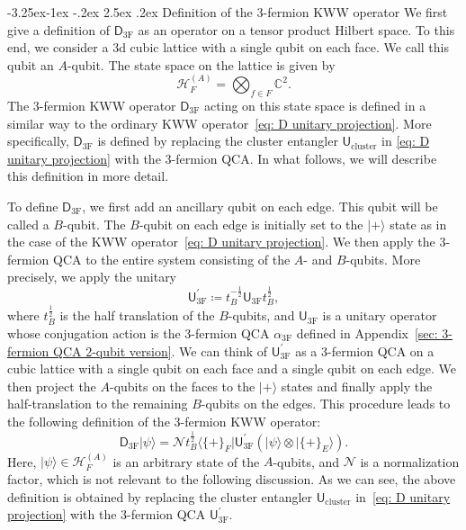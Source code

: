 \documentclass[aps,twocolumn,prx,floatfix,preprintnumbers, nofootinbib,10pt]{revtex4-2}
\makeatletter
\numberwithin{equation}{section}
\theoremstyle{definition}
\theoremstyle{remark}
\theoremstyle{claim}
\renewcommand\subsubsection{\@startsection{subsubsection}{3}{\z@}%
                                     {-3.25ex\@plus -1ex \@minus -.2ex}%
                                     {2.5ex \@plus .2ex}%
                                     {\centering\itshape\bfseries\small}}
\def\bra#1{{\langle{#1}|}}
\def\ket#1{{|{#1}\rangle}}
\renewcommand{\sf}[1]{\mathsf{#1}}
\makeatother
\begin{document}
\subsubsection{Definition of the 3-fermion KWW operator}
We first give a definition of $\mathsf{D}_\text{3F}$ as an operator on a tensor product Hilbert space.
To this end, we consider a 3d cubic lattice with a single qubit on each face.
We call this qubit an $A$-qubit.
The state space on the lattice is given by
\begin{equation}
\mathcal{H}_F^{(A)} = \bigotimes_{f \in F} \mathbb{C}^2.
\end{equation}
The 3-fermion KWW operator $\mathsf{D}_\text{3F}$ acting on this state space is defined in a similar way to the ordinary KWW operator~\eqref{eq: D unitary projection}.
More specifically, $\mathsf{D}_\text{3F}$ is defined by replacing the cluster entangler $\sf{U}_{\mathrm{cluster}}$ in \eqref{eq: D unitary projection} with the 3-fermion QCA.
In what follows, we will describe this definition in more detail.

To define $\mathsf{D}_\text{3F}$, we first add an ancillary qubit on each edge.
This qubit will be called a $B$-qubit.
The $B$-qubit on each edge is initially set to the $\ket{+}$ state as in the case of the KWW operator~\eqref{eq: D unitary projection}.
We then apply the 3-fermion QCA to the entire system consisting of the $A$- and $B$-qubits.
More precisely, we apply the unitary
\begin{equation}
\sf{U}_\text{3F}^{\prime} \coloneq t^{-\frac{1}{2}}_B \sf{U}_\text{3F} t^{\frac{1}{2}}_B,
\end{equation}
where $t_B^{\frac{1}{2}}$ is the half translation of the $B$-qubits, and $\sf{U}_\text{3F}$ is a unitary operator whose conjugation action is the 3-fermion QCA $\alpha_\text{3F}$ defined in Appendix~\ref{sec: 3-fermion QCA 2-qubit version}.
We can think of $\sf{U}_\text{3F}^{\prime}$ as a 3-fermion QCA on a cubic lattice with a single qubit on each face and a single qubit on each edge.
We then project the $A$-qubits on the faces to the $\ket{+}$ states and finally apply the half-translation to the remaining $B$-qubits on the edges.
This procedure leads to the following definition of the 3-fermion KWW operator:
\begin{equation}
\mathsf{D}_\text{3F} \ket{\psi} = \mathcal{N} t_B^{\frac{1}{2}} \bra{\{+\}_F} \sf{U}_\text{3F}^{\prime} \left( \ket{\psi} \otimes \ket{\{+\}_E} \right).
\label{eq: D3F op0}
\end{equation}
Here, $\ket{\psi} \in \mathcal{H}_F^{(A)}$ is an arbitrary state of the $A$-qubits, and $\mathcal{N}$ is a normalization factor, which is not relevant to the following discussion.
As we can see, the above definition is obtained by replacing the cluster entangler $\sf{U}_{\mathrm{cluster}}$ in~\eqref{eq: D unitary projection} with the 3-fermion QCA $\sf{U}_\text{3F}^{\prime}$.
\end{document}
